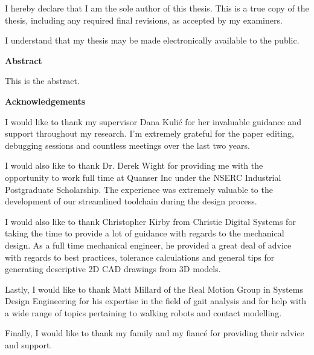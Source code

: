 \noindent
I hereby declare that I am the sole author of this thesis. This is a true copy of the thesis, including any required final revisions, as accepted by my examiners.

\bigskip
  
\noindent
I understand that my thesis may be made electronically available to the public.

\cleardoublepage


\begin{center}
    \textbf{Abstract}
\end{center}

This is the abstract.

\cleardoublepage


\begin{center}
    \textbf{Acknowledgements}
\end{center}

I would like to thank my supervisor Dana Kuli\'{c} for her invaluable guidance and support throughout my research. I'm extremely grateful for the paper editing, debugging sessions and countless meetings over the last two years.  

I would also like to thank Dr. Derek Wight for providing me with the opportunity to work full time at Quanser Inc under the NSERC Industrial Postgraduate Scholarship. The experience was extremely valuable to the development of our streamlined toolchain during the design process.  

I would also like to thank Christopher Kirby from Christie Digital Systems for taking the time to provide a lot of guidance with regards to the mechanical design. As a full time mechanical engineer, he provided a great deal of advice with regards to best practices, tolerance calculations and general tips for generating descriptive 2D CAD drawings from 3D models.

Lastly, I would like to thank Matt Millard of the Real Motion Group in Systems Design Engineering for his expertise in the field of gait analysis and for help with a wide range of topics pertaining to walking robots and contact modelling. 

Finally, I would like to thank my family and my fianc\'{e} for providing their advice and support. 

\cleardoublepage



